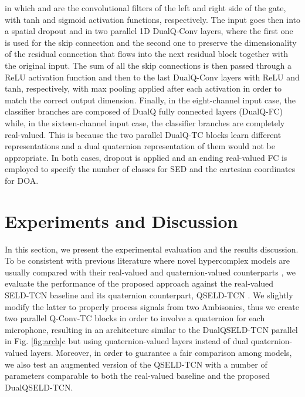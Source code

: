 \documentclass[3p, preprint, twocolumn]{elsarticle}
\begin{document}
\noindent in which  and  are the convolutional filters of the left and right side of the gate, with tanh and sigmoid activation functions, respectively. The input goes then into a spatial dropout and in two parallel 1D DualQ-Conv layers, where the first one is used for the skip connection and the second one to preserve the dimensionality of the residual connection that flows into the next residual block together with the original input. The sum of all the skip connections is then passed through a ReLU activation function and then to the last DualQ-Conv layers with ReLU and tanh, respectively, with max pooling applied after each activation in order to match the correct output dimension. Finally, in the eight-channel input case, the classifier branches are composed of DualQ fully connected layers (DualQ-FC) while, in the sixteen-channel input case, the classifier branches are completely real-valued. This is because the two parallel DualQ-TC blocks learn different representations and a dual quaternion representation of them would not be appropriate. In both cases, dropout is applied and an ending real-valued FC is employed to specify the number of classes for SED and the cartesian coordinates for DOA.






\section{Experiments and Discussion}
\label{sec:exp}

In this section, we present the experimental evaluation and the results discussion. To be consistent with previous literature where novel hypercomplex models are usually compared with their real-valued and quaternion-valued counterparts \cite{grassucci2021lightweight}, we evaluate the performance of the proposed approach against the real-valued SELD-TCN baseline \cite{SELD-TCN} and its quaternion counterpart, QSELD-TCN \cite{Brignone2022ISCAS}. We slightly modify the latter to properly process signals from two Ambisonics, thus we create two parallel Q-Conv-TC blocks in order to involve a quaternion for each microphone, resulting in an architecture similar to the DualQSELD-TCN parallel in Fig. \ref{fig:arch}c but using quaternion-valued layers instead of dual quaternion-valued layers. Moreover, in order to guarantee a fair comparison among models, we also test an augmented version of the QSELD-TCN with a number of parameters comparable to both the real-valued baseline and the proposed DualQSELD-TCN.
\end{document}

